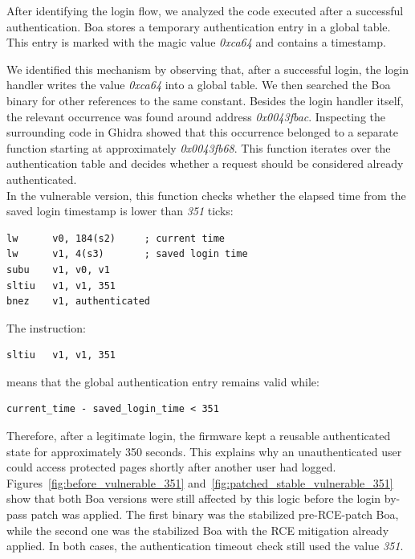   After identifying the login flow, we analyzed the code executed after a successful authentication. Boa stores a temporary authentication entry in a global table. This entry is marked with the magic value \emph{0xca64} and contains a timestamp.

  We identified this mechanism by observing that, after a successful login, the login handler writes the value \emph{0xca64} into a global table. We then searched the Boa binary for other references to the same constant. Besides the login handler itself, the relevant occurrence was found around address \emph{0x0043fbac}. Inspecting the surrounding code in Ghidra showed that this occurrence belonged to a separate function starting at approximately \emph{0x0043fb68}. This function iterates over the authentication table and decides whether a request should be considered already authenticated.
  \\
  In the vulnerable version, this function checks whether the elapsed time from the saved login timestamp is lower than \emph{351} ticks:

\begin{lstlisting}[language=Asm]
lw      v0, 184(s2)     ; current time
lw      v1, 4(s3)       ; saved login time
subu    v1, v0, v1
sltiu   v1, v1, 351
bnez    v1, authenticated
\end{lstlisting}

  The instruction:

\begin{lstlisting}[language=Asm]
sltiu   v1, v1, 351
\end{lstlisting}

  means that the global authentication entry remains valid while:

\begin{lstlisting}
current_time - saved_login_time < 351
\end{lstlisting}

  Therefore, after a legitimate login, the firmware kept a reusable authenticated state for approximately 350 seconds. This explains why an unauthenticated user could access protected pages shortly after another user had logged. Figures~\ref{fig:before_vulnerable_351} and~\ref{fig:patched_stable_vulnerable_351} show that both Boa versions were still affected by this logic before the login by-pass patch was applied. The first binary was the stabilized pre-RCE-patch Boa, while the second one was the stabilized Boa with the RCE mitigation already applied. In both cases, the authentication timeout check still used the value \emph{351}.

